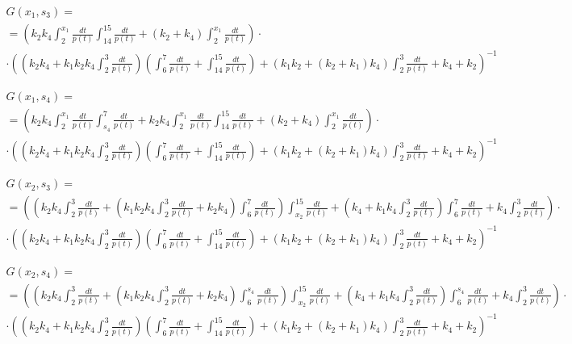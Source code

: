 \documentclass[a4paper,12pt]{article} %
\begin{document}
\begin{multline}
	G(x_1,s_3)=\\=
	\left(
		k_2 k_4 \int_{2}^{x_1}\frac{dt}{p(t)} \int_{14}^{15}\frac{dt}{p(t)}+\left( k_2+k_4\right)  \int_{2}^{x_1}\frac{dt}{p(t)}
	\right) \cdot \\ \cdot \left(
		\left( k_2 k_4+k_1 k_2 k_4 \int_{2}^{3}\frac{dt}{p(t)}\right)
		\left( \int_{6}^{7}\frac{dt}{p(t)}+ \int_{14}^{15}\frac{dt}{p(t)} \right)+
		\left( k_1 k_2+\left( k_2+k_1\right)  k_4\right)  \int_{2}^{3}\frac{dt}{p(t)}+k_4+k_2
	\right)^{-1}
\end{multline}

\begin{multline}
	G(x_1,s_4)=\\=
	\left(
		k_2 k_4 \int_{2}^{x_1}\frac{dt}{p(t)} \int_{s_4}^{7}\frac{dt}{p(t)}+k_2 k_4 \int_{2}^{x_1}\frac{dt}{p(t)} \int_{14}^{15}\frac{dt}{p(t)}+\left( k_2+k_4\right)  \int_{2}^{x_1}\frac{dt}{p(t)}
	\right) \cdot \\ \cdot \left(
		\left( k_2 k_4+k_1 k_2 k_4 \int_{2}^{3}\frac{dt}{p(t)}\right)
		\left( \int_{6}^{7}\frac{dt}{p(t)}+ \int_{14}^{15}\frac{dt}{p(t)} \right)+
		\left( k_1 k_2+\left( k_2+k_1\right)  k_4\right)  \int_{2}^{3}\frac{dt}{p(t)}+k_4+k_2
	\right)^{-1}
\end{multline}

\begin{multline}
	G(x_2,s_3)=\\=
	\left(
		\left( k_2 k_4 \int_{2}^{3}\frac{dt}{p(t)}+\left( k_1 k_2 k_4 \int_{2}^{3}\frac{dt}{p(t)}+k_2 k_4\right)  \int_{6}^{7}\frac{dt}{p(t)}\right)  \int_{x_2}^{15}\frac{dt}{p(t)}+\left( k_4+k_1 k_4 \int_{2}^{3}\frac{dt}{p(t)}\right)  \int_{6}^{7}\frac{dt}{p(t)}+k_4 \int_{2}^{3}\frac{dt}{p(t)}
	\right) \cdot \\ \cdot \left(
		\left( k_2 k_4+k_1 k_2 k_4 \int_{2}^{3}\frac{dt}{p(t)}\right)
		\left( \int_{6}^{7}\frac{dt}{p(t)}+ \int_{14}^{15}\frac{dt}{p(t)} \right)+
		\left( k_1 k_2+\left( k_2+k_1\right)  k_4\right)  \int_{2}^{3}\frac{dt}{p(t)}+k_4+k_2
	\right)^{-1}
\end{multline}

\begin{multline}
	G(x_2,s_4)=\\=
	\left(
		\left( k_2 k_4 \int_{2}^{3}\frac{dt}{p(t)}+\left( k_1 k_2 k_4 \int_{2}^{3}\frac{dt}{p(t)}+k_2 k_4\right)  \int_{6}^{s_4}\frac{dt}{p(t)}\right)  \int_{x_2}^{15}\frac{dt}{p(t)}+\left( k_4+k_1 k_4 \int_{2}^{3}\frac{dt}{p(t)}\right)  \int_{6}^{s_4}\frac{dt}{p(t)}+k_4 \int_{2}^{3}\frac{dt}{p(t)}
	\right) \cdot \\ \cdot \left(
		\left( k_2 k_4+k_1 k_2 k_4 \int_{2}^{3}\frac{dt}{p(t)}\right)
		\left( \int_{6}^{7}\frac{dt}{p(t)}+ \int_{14}^{15}\frac{dt}{p(t)} \right)+
		\left( k_1 k_2+\left( k_2+k_1\right)  k_4\right)  \int_{2}^{3}\frac{dt}{p(t)}+k_4+k_2
	\right)^{-1}
\end{multline}
\end{document}
